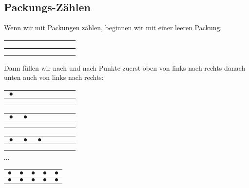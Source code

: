 \documentclass[a4paper]{amsart}
\theoremstyle{definition}
\begin{document}
\subsection{Packungs-Zählen}
Wenn wir mit Packungen zählen, beginnen wir mit einer leeren Packung:

\begin{tabular}{|c|c|c|c|c|}
   \hline
   $\phantom\bullet$ & $\phantom\bullet$ & $\phantom\bullet$ & $\phantom\bullet$ & $\phantom\bullet$\\
   \hline
   $\phantom\bullet$ & $\phantom\bullet$ & $\phantom\bullet$ & $\phantom\bullet$ & $\phantom\bullet$\\
   \hline
\end{tabular}

Dann füllen wir nach und nach Punkte zuerst oben von links nach rechts danach unten auch von links nach rechts:

\begin{tabular}{|c|c|c|c|c|}
   \hline
   $\bullet$ & $\phantom\bullet$ & $\phantom\bullet$ & $\phantom\bullet$ & $\phantom\bullet$\\
   \hline
   $\phantom\bullet$ & $\phantom\bullet$ & $\phantom\bullet$ & $\phantom\bullet$ & $\phantom\bullet$\\
   \hline
\end{tabular}

\begin{tabular}{|c|c|c|c|c|}
   \hline
   $\bullet$ & $\bullet$ & $\phantom\bullet$ & $\phantom\bullet$ & $\phantom\bullet$\\
   \hline
   $\phantom\bullet$ & $\phantom\bullet$ & $\phantom\bullet$ & $\phantom\bullet$ & $\phantom\bullet$\\
   \hline
\end{tabular}

\begin{tabular}{|c|c|c|c|c|}
   \hline
   $\bullet$ & $\bullet$ & $\bullet$ & $\phantom\bullet$ & $\phantom\bullet$\\
   \hline
   $\phantom\bullet$ & $\phantom\bullet$ & $\phantom\bullet$ & $\phantom\bullet$ & $\phantom\bullet$\\
   \hline
\end{tabular} $\cdots$

\begin{tabular}{|c|c|c|c|c|}
   \hline
   $\bullet$ & $\bullet$ & $\bullet$ & $\bullet$ & $\bullet$\\
   \hline
   $\bullet$ & $\bullet$ & $\bullet$ & $\bullet$ & $\bullet$\\
   \hline
\end{tabular}
\end{document}
